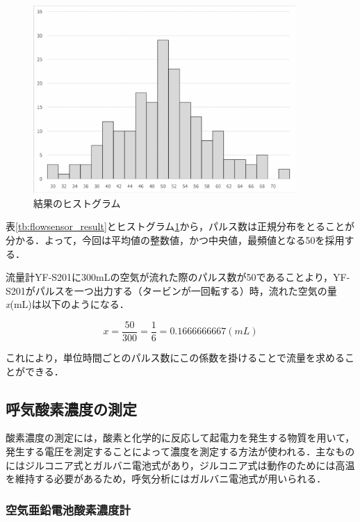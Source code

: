 \begin{figure}[H]
  \begin{center}
    \caption{結果のヒストグラム}
    \label{fig:flowsensor_histogram}
    \includegraphics[width=10cm]{fig/flowsensor_histogram}
  \end{center}
\end{figure}

表\ref{tb:flowsensor_result}とヒストグラム\ref{fig:flowsensor_histogram}から，パルス数は正規分布をとることが分かる．よって，今回は平均値の整数値，かつ中央値，最頻値となる50を採用する．

流量計YF-S201に300mLの空気が流れた際のパルス数が50であることより，YF-S201がパルスを一つ出力する（タービンが一回転する）時，流れた空気の量{\it x}(mL)は以下のようになる．

\begin{equation}
  \label{eq:pulse_per_ml}
  x = \frac{50}{300} = \frac{1}{6} = 0.1666666667 (mL)
\end{equation}

これにより，単位時間ごとのパルス数にこの係数を掛けることで流量を求めることができる．

\subsection{呼気酸素濃度の測定}

酸素濃度の測定には，酸素と化学的に反応して起電力を発生する物質を用いて，発生する電圧を測定することによって濃度を測定する方法が使われる．主なものにはジルコニア式とガルバニ電池式があり，ジルコニア式は動作のためには高温を維持する必要があるため，呼気分析にはガルバニ電池式が用いられる．

\subsubsection{空気亜鉛電池酸素濃度計}
\label{sec:o2sensor_a-5s}

